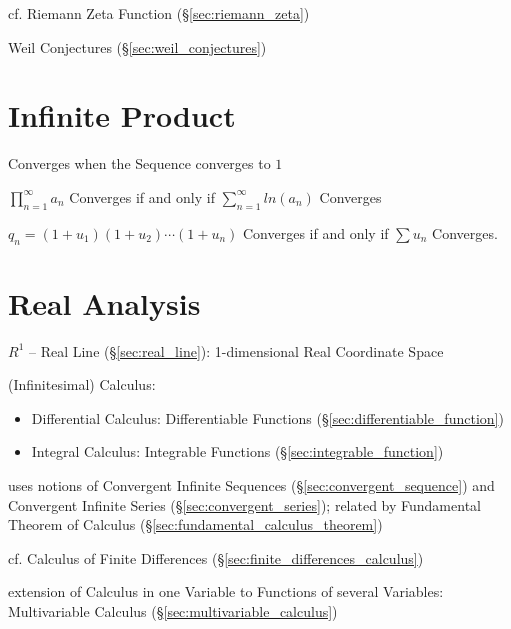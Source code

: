 cf. Riemann Zeta Function (\S\ref{sec:riemann_zeta})

\fist Weil Conjectures (\S\ref{sec:weil_conjectures})



\section{Infinite Product}\label{sec:infinite_product}

Converges when the Sequence converges to $1$

$\prod_{n=1}^\infty a_n$ Converges if and only if $\sum_{n=1}^\infty
ln(a_n)$ Converges

$q_n = (1 + u_1)(1 + u_2)\cdots(1 + u_n)$ Converges if and only if
$\sum u_n$ Converges.



\section{Real Analysis}\label{sec:real_analysis}

$R^1$ -- Real Line (\S\ref{sec:real_line}): 1-dimensional Real
Coordinate Space

(Infinitesimal) Calculus:
\begin{itemize}
\item Differential Calculus: Differentiable Functions
  (\S\ref{sec:differentiable_function})
\item Integral Calculus: Integrable Functions (\S\ref{sec:integrable_function})
\end{itemize}
uses notions of Convergent Infinite Sequences (\S\ref{sec:convergent_sequence})
and Convergent Infinite Series (\S\ref{sec:convergent_series}); related by
Fundamental Theorem of Calculus (\S\ref{sec:fundamental_calculus_theorem})

\fist cf. Calculus of Finite Differences
(\S\ref{sec:finite_differences_calculus})

\fist extension of Calculus in one Variable to Functions of several Variables:
Multivariable Calculus (\S\ref{sec:multivariable_calculus})



